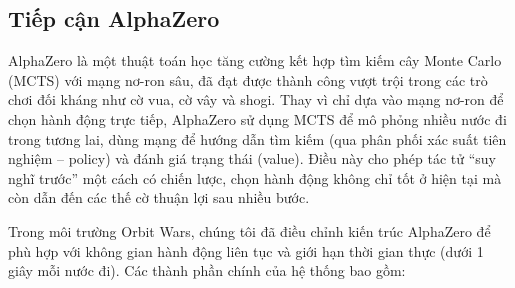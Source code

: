 \subsection{Tiếp cận AlphaZero}

AlphaZero là một thuật toán học tăng cường kết hợp tìm kiếm cây Monte Carlo (MCTS) với mạng nơ-ron sâu, đã đạt được thành công vượt trội trong các trò chơi đối kháng như cờ vua, cờ vây và shogi. 
Thay vì chỉ dựa vào mạng nơ-ron để chọn hành động trực tiếp, AlphaZero sử dụng MCTS để mô phỏng nhiều nước đi trong tương lai, dùng mạng để hướng dẫn tìm kiếm (qua phân phối xác suất tiên nghiệm – policy) và đánh giá trạng thái (value). 
Điều này cho phép tác tử “suy nghĩ trước” một cách có chiến lược, chọn hành động không chỉ tốt ở hiện tại mà còn dẫn đến các thế cờ thuận lợi sau nhiều bước.

Trong môi trường Orbit Wars, chúng tôi đã điều chỉnh kiến trúc AlphaZero để phù hợp với không gian hành động liên tục và giới hạn thời gian thực (dưới 1 giây mỗi nước đi). 
Các thành phần chính của hệ thống bao gồm:

